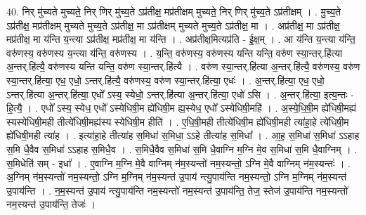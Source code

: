 \documentclass[17pt]{extarticle}
\begin{document}
40. निर् मु॑च्यते मुच्यते॒ निर् णिर् मु॑च्य॒ते ऽप्र॑तीक्ष॒ मप्र॑तीक्षम् मुच्यते॒ निर् णिर् मु॑च्य॒ते ऽप्र॑तीक्षम् । . मु॒च्य॒ते ऽप्र॑तीक्ष॒ मप्र॑तीक्षम् मुच्यते मुच्य॒ते ऽप्र॑तीक्ष॒ मा ऽप्र॑तीक्षम् मुच्यते मुच्य॒ते ऽप्र॑तीक्ष॒ मा । . अप्र॑तीक्ष॒ मा ऽप्र॑तीक्ष॒ मप्र॑तीक्ष॒ मा य॑न्ति य॒न्त्या ऽप्र॑तीक्ष॒ मप्र॑तीक्ष॒ मा य॑न्ति । . अप्र॑तीक्ष॒मित्यप्र॑ति - ई॒क्ष॒म् । . आ य॑न्ति य॒न्त्या य॑न्ति॒ वरु॑णस्य॒ वरु॑णस्य य॒न्त्या य॑न्ति॒ वरु॑णस्य । . य॒न्ति॒ वरु॑णस्य॒ वरु॑णस्य यन्ति यन्ति॒ वरु॑ण स्या॒न्तर्.हि॑त्या अ॒न्तर्.हि॑त्यै॒ वरु॑णस्य यन्ति यन्ति॒ वरु॑ण स्या॒न्तर्.हि॑त्यै । . वरु॑ण स्या॒न्तर्.हि॑त्या अ॒न्तर्.हि॑त्यै॒ वरु॑णस्य॒ वरु॑ण स्या॒न्तर्.हि॑त्या॒ एध॒ एधो॒ ऽन्तर्.हि॑त्यै॒ वरु॑णस्य॒ वरु॑ण स्या॒न्तर्.हि॑त्या॒ एधः॑ । . अ॒न्तर्.हि॑त्या॒ एध॒ एधो॒ ऽन्तर्.हि॑त्या अ॒न्तर्.हि॑त्या॒ एधो᳚ ऽस्य॒ स्येधो॒ ऽन्तर्.हि॑त्या अ॒न्तर्.हि॑त्या॒ एधो॑ ऽसि । . अ॒न्तर्.हि॑त्या॒ इत्य॒न्तः - हि॒त्यै॒ । . एधो᳚ ऽस्य॒ स्येध॒ एधो᳚ ऽस्येधिषी॒म ह्ये॑धिषी॒म ह्य॒स्येध॒ एधो᳚ ऽस्येधिषी॒महि॑ । . अ॒स्ये॒धि॒षी॒म ह्ये॑धिषी॒मह्य॑ स्यस्येधिषी॒मही तीत्ये॑धिषी॒मह्य॑स्य स्येधिषी॒म हीति॑ । . ए॒धि॒षी॒मही तीत्ये॑धिषी॒म ह्ये॑धिषी॒मही त्या॑हा॒हे त्ये॑धिषी॒म ह्ये॑धिषी॒मही त्या॑ह । . इत्या॑हा॒हे तीत्या॑ह स॒मिधा॑ स॒मिधा॒ ऽऽहे तीत्या॑ह स॒मिधा᳚ । . आ॒ह॒ स॒मिधा॑ स॒मिधा॑ ऽऽहाह स॒मि धै॒वैव स॒मिधा॑ ऽऽहाह स॒मिधै॒व । . स॒मिधै॒वैव स॒मिधा॑ स॒मि धै॒वाग्नि म॒ग्नि मे॒व स॒मिधा॑ स॒मि धै॒वाग्निम् । . स॒मिधेति॑ सम् - इधा᳚ । . ए॒वाग्नि म॒ग्नि मे॒वै वाग्निम् न॑म॒स्यन्तो॑ नम॒स्यन्तो॒ ऽग्नि मे॒वै वाग्निम् न॑म॒स्यन्तः॑ । . अ॒ग्निम् न॑म॒स्यन्तो॑ नम॒स्यन्तो॒ ऽग्नि म॒ग्निम् न॑म॒स्यन्त॑ उ॒पाय॑ न्त्यु॒पाय॑न्ति नम॒स्यन्तो॒ ऽग्नि म॒ग्निम् न॑म॒स्यन्त॑ उ॒पाय॑न्ति । . न॒म॒स्यन्त॑ उ॒पाय॑ न्त्यु॒पाय॑न्ति नम॒स्यन्तो॑ नम॒स्यन्त॑ उ॒पाय॑न्ति॒ तेज॒ स्तेज॑ उ॒पाय॑न्ति नम॒स्यन्तो॑ नम॒स्यन्त॑ उ॒पाय॑न्ति॒ तेजः॑ । \newline
\end{document}
